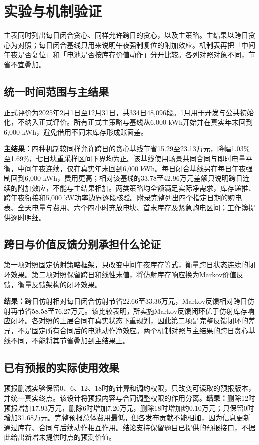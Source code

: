\documentclass[UTF8,a4paper,zihao=-4,fontset=mac]{ctexart}
\begin{document}
\section{实验与机制验证}
主表同时列出每日闭合贪心、同样允许跨日的贪心，以及主策略。主结果以跨日贪心为对照；每日闭合基线只用来说明午夜强制复位的附加效应。机制表再把「中间午夜是否复位」和「电池是否按库存价值动作」分开比较。各列对照对象不同，节省不宜叠加。

\subsection{统一时间范围与主结果}
正式评价为2025年2月1日至12月31日，共334日48,096段。1月用于开发与公共初始化，不纳入正式评价。所有正式主策略与基线从6,000 kWh开始并在真实年末回到6,000 kWh，避免借用不同末库存形成账面差。


\textbf{主结果：}四种机制较同样允许跨日的贪心基线节省15.29至23.13万元，降幅1.03\%至1.69\%，七日块重采样区间下界均为正。该基线使用场景共同合同与即时电量平衡，中间午夜连续，仅在真实年末回到6,000 kWh。每日闭合基线另在每日午夜强制回到6,000 kWh，费用更高；相对该基线的33.78至42.96万元差额只说明跨日连续的附加效应，不能与主结果相加。两类策略均全额满足实际净需求，库存递推、跨午夜衔接和5,000 kW功率边界逐段核验。附录完整列出四个指定日期的购电表、全天电量与费用、六个四小时充放电块、首末库存及紧急购电区间；工作簿提供逐时明细。

\subsection{跨日与价值反馈分别承担什么论证}
第一项对照固定仿射策略框架，只改变中间午夜库存等式，衡量跨日状态连续的闭环效果。第二项对照保留跨日和线性末值，将仿射库存响应换为Markov价值反馈，衡量反馈架构的闭环效果。

\textbf{结果：}跨日仿射相对每日闭合仿射节省22.66至33.36万元，Markov反馈相对跨日仿射再节省58.58至76.27万元。该比较表明，所实施Markov反馈闭环优于仿射库存响应闭环。各对照的上层合同在真实状态下重规划，因此第二项是完整反馈闭环的差异，不是固定所有合同后的电池动作净效应。两个机制对照与主结果的跨日贪心基线不同，不能将其节省叠加到主结果上。

\subsection{已有预报的实际使用效果}

预报删减实验保留0、6、12、18时的计算和调约权限，只改变可读取的预报版本，并统一真实终点。该设计将预报内容与合同调整权限的作用分离。\textbf{结果：}删除12时预报增加17.93万元，删除6时增加7.20万元，删除18时增加约0.10万元；只保留0时增加31.68万元。完整预报总体费用最低，但各发布贡献不能相加，因为信息更新通过库存、合同与后续动作相互作用。结论支持保留题目已提供的预报接口，不据此给出新增未提供时点的预测价值。
\end{document}
